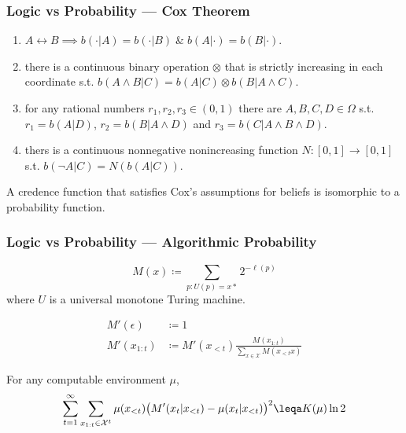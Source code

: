 \documentclass[UTF8,11pt,colorlinks,compress,openany]{beamer}%
\begin{document}
\begin{frame}\frametitle{Logic vs Probability --- Cox Theorem}
\begin{center}
\end{center}
\begin{assumption}
\begin{enumerate}
	\item $A\leftrightarrow B\implies b(\cdot|A)=b(\cdot|B)\;\&\;b(A|\cdot)=b(B|\cdot)$.
	\item there is a continuous binary operation $\otimes$ that is strictly increasing in each coordinate s.t. $b(A\wedge B|C)=b(A|C)\otimes b(B|A\wedge C)$.
	\item for any rational numbers $r_1,r_2,r_3\in (0,1)$ there are $A,B,C,D\in\Omega$ s.t. $r_1=b(A|D)$, $r_2=b(B|A\wedge D)$ and $r_3=b(C|A\wedge B\wedge D)$.
	\item thers is a continuous nonnegative nonincreasing function $N: [0,1]\to [0,1]$ s.t. $b(\neg A|C)=N(b(A|C))$.
\end{enumerate}
\end{assumption}
\begin{theorem}
A credence function that satisfies Cox's assumptions for beliefs is isomorphic to a probability function.
\end{theorem}
\end{frame}

\begin{frame}\frametitle{Logic vs Probability --- Algorithmic Probability}
\setlength\abovedisplayskip{0pt}
\setlength\belowdisplayskip{0pt}
\begin{definition}
	\[M(x)\coloneqq \sum\limits_{p:U(p)=x*}2^{-\ell(p)}\]
	where $U$ is a universal monotone Turing machine.
\end{definition}
\begin{align*}
	M'(\epsilon)&\coloneqq 1\\
	M'(x_{1:t})&\coloneqq M'(x_{<t})\frac{M(x_{1:t})}{\sum\limits_{x\in\mathcal{X}}M(x_{<t}x)}
\end{align*}
\begin{theorem}
		For any computable environment $\mu$,
		\[\sum\limits_{t=1}^\infty\sum\limits_{x_{1:t}\in\mathcal{X}^t}\mu(x_{<t})\big(M'(x_t|x_{<t})-\mu(x_t|x_{<t})\big)^2\leqa K(\mu)\ln2\]
\end{theorem}
\end{frame}
\end{document}
